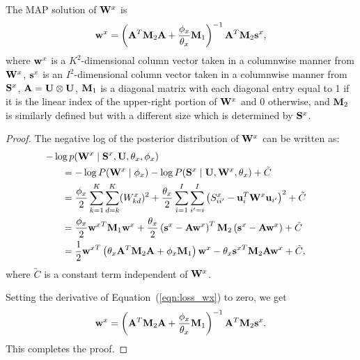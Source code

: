 \begin{mythe}
The \mbox{MAP} solution of $\W^{x}$ is
\begin{align}
\w^{x} =\left(\A^T\M_2\A +\frac{\phi_x}{\theta_x}\M_1\right)^{-1}\A^T\M_2\s^x, \nonumber
\end{align}
where $ \w^{x}  $ is a $ K^2 $-dimensional column vector taken in a columnwise manner from $ \W^x $, $ \s^{x} $ is an $ I^2 $-dimensional column vector taken in a columnwise manner from $ \S^{x} $,  $ \A = \U\otimes \U $, $\M_1$ is a diagonal matrix with each diagonal entry equal to 1 if it is the linear index of the upper-right portion of $\W^{x}$ and 0 otherwise, and $\M_2$ is similarly defined but with a different size which is determined by $\S^{x}$.
\label{theorem:updatewx}
\end{mythe}
\begin{proof}
The negative log of the posterior distribution of $ \W^{x} $ can be written as:
\begin{align}
\label{eqn:loss_wx}
\lefteqn{-\log p(\W^{x}\mid \S^{x}, \U,\theta_{x},\phi_{x} )} \\ & \ \ \ \ \ 
=  -\log P(\W^{x}\mid \phi_{x}) - \log P(\S^{x}\mid \U ,\W^{x},\theta_{x}) + \tilde{C}\nonumber\\ & \ \ \ \ \ 
=\frac{\phi_x}{2}\sum_{ k=1}^{K}\sum_{ d=k}^{K}(W^{x}_{kd})^2 + \frac{\theta_x}{2}\sum_{ i=1}^{I}\sum_{ i'=i}^{I}\left(S^{x}_{ii'}-\u_i^T\W^x\u_{i'}\right)^2+\tilde{C}\nonumber\\ & \ \ \ \ \ 
=\frac{\phi_x}{2}{\w^{x}}^T\M_1\w^{x}
+\frac{\theta_x}{2}\left(\s^{x}-\A\w^{x}\right)^T\M_2\left(\s^{x}-\A\w^{x}\right)+\tilde{C}\nonumber\\ & \ \ \ \ \ 
= \frac{1}{2}{\w^{x}}^T \left(\theta_x\A^T\M_2\A+\phi_x\M_1\right)\w^{x}
-\theta_x {\s^x}^T\M_2\A\w^{x} +\tilde{C},\nonumber
\end{align}
where $ \tilde{C} $ is a constant term independent of $ \W^{x} $.


Setting the derivative of Equation~(\ref{eqn:loss_wx}) to zero, we get
\begin{align}
\w^{x} =\left(\A^T\M_2\A +\frac{\phi_x}{\theta_x}\M_1\right)^{-1}\A^T\M_2\s^x. \nonumber
\end{align}
This completes the proof.
\end{proof}


